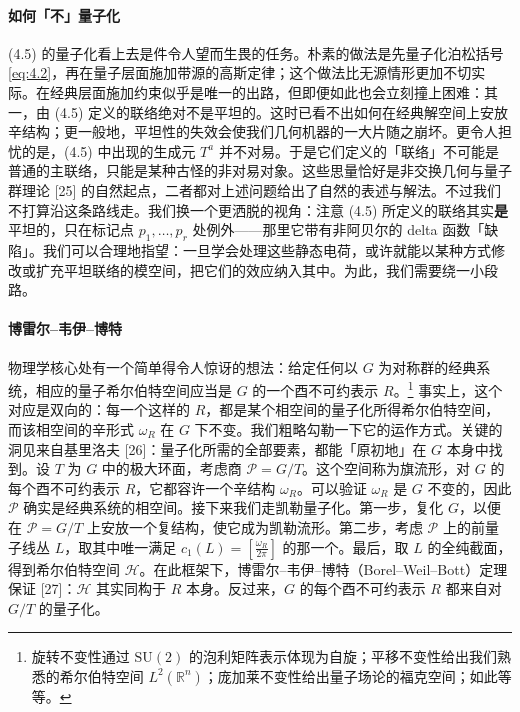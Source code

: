 \documentclass[11pt,a4paper]{article}
\newcommand{\R}{\mathbb{R}}
\begin{document}
\paragraph{如何「不」量子化}
(4.5) 的量子化看上去是件令人望而生畏的任务。朴素的做法是先量子化泊松括号 \eqref{eq:4.2}，再在量子层面施加带源的高斯定律；这个做法比无源情形更加不切实际。在经典层面施加约束似乎是唯一的出路，但即便如此也会立刻撞上困难：其一，由 (4.5) 定义的联络绝对不是平坦的。这时已看不出如何在经典解空间上安放辛结构；更一般地，平坦性的失效会使我们几何机器的一大片随之崩坏。更令人担忧的是，(4.5) 中出现的生成元 $T^a$ 并不对易。于是它们定义的「联络」不可能是普通的主联络，只能是某种古怪的非对易对象。这些思量恰好是非交换几何与量子群理论 [25] 的自然起点，二者都对上述问题给出了自然的表述与解法。不过我们不打算沿这条路线走。我们换一个更洒脱的视角：注意 (4.5) 所定义的联络其实\textbf{是}平坦的，只在标记点 $p_1,\dots,p_r$ 处例外——那里它带有非阿贝尔的 delta 函数「缺陷」。我们可以合理地指望：一旦学会处理这些静态电荷，或许就能以某种方式修改或扩充平坦联络的模空间，把它们的效应纳入其中。为此，我们需要绕一小段路。


\paragraph{博雷尔–韦伊–博特}
物理学核心处有一个简单得令人惊讶的想法：给定任何以 $G$ 为对称群的经典系统，相应的量子希尔伯特空间应当是 $G$ 的一个酉不可约表示 $R$。\footnote{旋转不变性通过 $\mathrm{SU}(2)$ 的泡利矩阵表示体现为自旋；平移不变性给出我们熟悉的希尔伯特空间 $L^2(\R^n)$；庞加莱不变性给出量子场论的福克空间；如此等等。} 事实上，这个对应是双向的：每一个这样的 $R$，都是某个相空间的量子化所得希尔伯特空间，而该相空间的辛形式 $\omega_R$ 在 $G$ 下不变。我们粗略勾勒一下它的运作方式。关键的洞见来自基里洛夫 [26]：量子化所需的全部要素，都能「原初地」在 $G$ 本身中找到。设 $T$ 为 $G$ 中的极大环面，考虑商 $\mathcal{P}=G/T$。这个空间称为旗流形，对 $G$ 的每个酉不可约表示 $R$，它都容许一个辛结构 $\omega_R$。可以验证 $\omega_R$ 是 $G$ 不变的，因此 $\mathcal{P}$ 确实是经典系统的相空间。接下来我们走凯勒量子化。第一步，复化 $G$，以便在 $\mathcal{P}=G/T$ 上安放一个复结构，使它成为凯勒流形。第二步，考虑 $\mathcal{P}$ 上的前量子线丛 $L$，取其中唯一满足 $c_1(L)=\left[\frac{\omega_R}{2\pi}\right]$ 的那一个。最后，取 $L$ 的全纯截面，得到希尔伯特空间 $\mathcal{H}$。在此框架下，博雷尔–韦伊–博特（Borel--Weil--Bott）定理保证 [27]：$\mathcal{H}$ 其实同构于 $R$ 本身。反过来，$G$ 的每个酉不可约表示 $R$ 都来自对 $G/T$ 的量子化。
\end{document}
